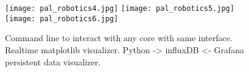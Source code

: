     \begin{figure}
      \begin{center}
         \texttt{[image: pal\_robotics4.jpg]}
         \texttt{[image: pal\_robotics5.jpg]}
         \texttt{[image: pal\_robotics6.jpg]}
      \end{center}
        \caption{Command line to interact with any core with same interface. Realtime matplotlib visualizer. Python -> influxDB <- Grafana persistent data visualizer. }
      \label{fig:novo_space}
   \end{figure}

